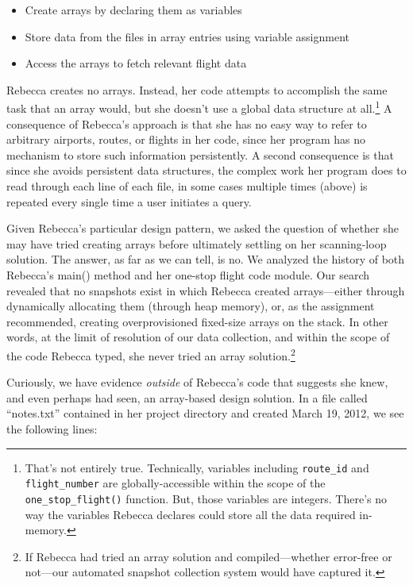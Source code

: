 \begin{itemize}
\tightlist
\item
  Create arrays by declaring them as variables
\item
  Store data from the files in array entries using variable assignment
\item
  Access the arrays to fetch relevant flight data
\end{itemize}

Rebecca creates no arrays. Instead, her code attempts to accomplish the same task that an array would, but she doesn't use a global data structure at all.\footnote{That's not entirely true. Technically, variables including \texttt{route\_id} and \texttt{flight\_number} are globally-accessible within the scope of the \texttt{one\_stop\_flight()} function. But, those variables are integers. There's no way the variables Rebecca declares could store all the data required in-memory.} A consequence of Rebecca's approach is that she has no easy way to refer to arbitrary airports, routes, or flights in her code, since her program has no mechanism to store such information persistently. A second consequence is that since she avoids persistent data structures, the complex work her program does to read through each line of each file, in some cases multiple times (above) is repeated every single time a user initiates a query.

Given Rebecca's particular design pattern, we asked the question of whether she may have tried creating arrays before ultimately settling on her scanning-loop solution. The answer, as far as we can tell, is no. We analyzed the history of both Rebecca's main() method and her one-stop flight code module. Our search revealed that no snapshots exist in which Rebecca created arrays---either through dynamically allocating them (through heap memory), or, as the assignment recommended, creating overprovisioned fixed-size arrays on the stack. In other words, at the limit of resolution of our data collection, and within the scope of the code Rebecca typed, she never tried an array solution.\footnote{If Rebecca had tried an array solution and compiled---whether error-free or not---our automated snapshot collection system would have captured it.}

Curiously, we have evidence \emph{outside} of Rebecca's code that suggests she knew, and even perhaps had seen, an array-based design solution. In a file called ``notes.txt'' contained in her project directory and created March 19, 2012, we see the following lines:

